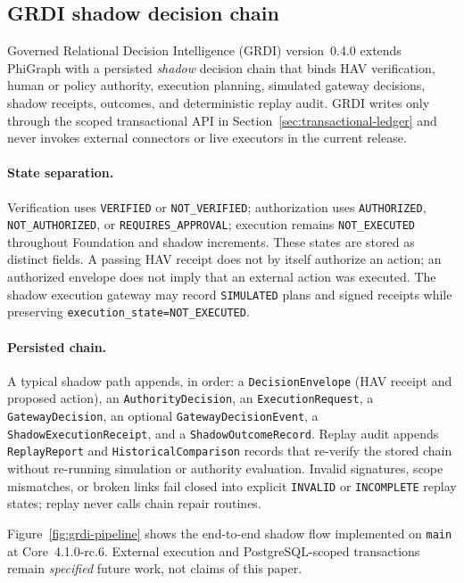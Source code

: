 \documentclass[11pt]{article}
\begin{document}
\subsection{GRDI shadow decision chain}
\label{sec:grdi}

Governed Relational Decision Intelligence (GRDI) version~0.4.0 extends PhiGraph
with a persisted \emph{shadow} decision chain that binds HAV verification,
human or policy authority, execution planning, simulated gateway decisions,
shadow receipts, outcomes, and deterministic replay audit. GRDI writes only
through the scoped transactional API in Section~\ref{sec:transactional-ledger}
and never invokes external connectors or live executors in the current release.

\paragraph{State separation.}
Verification uses \texttt{VERIFIED} or \texttt{NOT\_VERIFIED}; authorization
uses \texttt{AUTHORIZED}, \texttt{NOT\_AUTHORIZED}, or
\texttt{REQUIRES\_APPROVAL}; execution remains \texttt{NOT\_EXECUTED}
throughout Foundation and shadow increments. These states are stored as
distinct fields. A passing HAV receipt does not by itself authorize an action;
an authorized envelope does not imply that an external action was executed.
The shadow execution gateway may record \texttt{SIMULATED} plans and signed
receipts while preserving \texttt{execution\_state=NOT\_EXECUTED}.

\paragraph{Persisted chain.}
A typical shadow path appends, in order: a \texttt{DecisionEnvelope} (HAV
receipt and proposed action), an \texttt{AuthorityDecision}, an
\texttt{ExecutionRequest}, a \texttt{GatewayDecision}, an optional
\texttt{GatewayDecisionEvent}, a \texttt{ShadowExecutionReceipt}, and a
\texttt{ShadowOutcomeRecord}. Replay audit appends \texttt{ReplayReport} and
\texttt{HistoricalComparison} records that re-verify the stored chain without
re-running simulation or authority evaluation. Invalid signatures, scope
mismatches, or broken links fail closed into explicit \texttt{INVALID} or
\texttt{INCOMPLETE} replay states; replay never calls chain repair routines.

Figure~\ref{fig:grdi-pipeline} shows the end-to-end shadow flow implemented
on \texttt{main} at Core~4.1.0-rc.6. External execution and PostgreSQL-scoped
transactions remain \emph{specified} future work, not claims of this paper.
\end{document}

